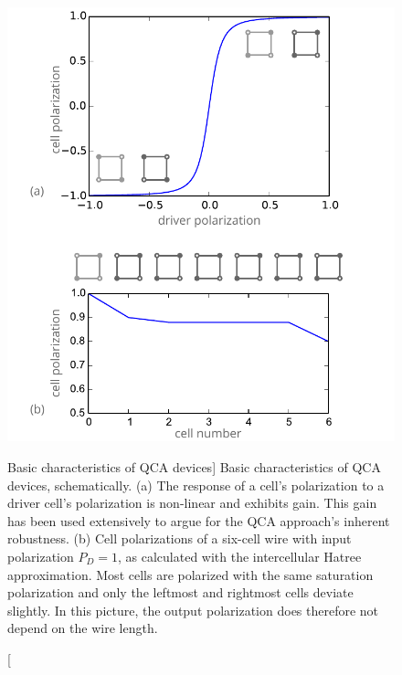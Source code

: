 \begin{figure}
  \center
  \includegraphics{qca_characterization}
  \caption
[Basic characteristics of QCA devices]
{
Basic characteristics of QCA devices, schematically. (a) The response of a
cell's polarization to a driver cell's polarization is non-linear and exhibits
gain. This gain has been used extensively to argue for the QCA approach's
inherent robustness. (b) Cell polarizations of a six-cell wire with input
polarization $P_D = 1$, as calculated with the intercellular Hatree
approximation. Most cells are polarized with the same saturation polarization
and only the leftmost and rightmost cells deviate slightly. In this picture, the
output polarization does therefore not depend on the wire length.
}
  \label{fig:qca_characterization}
\end{figure}

